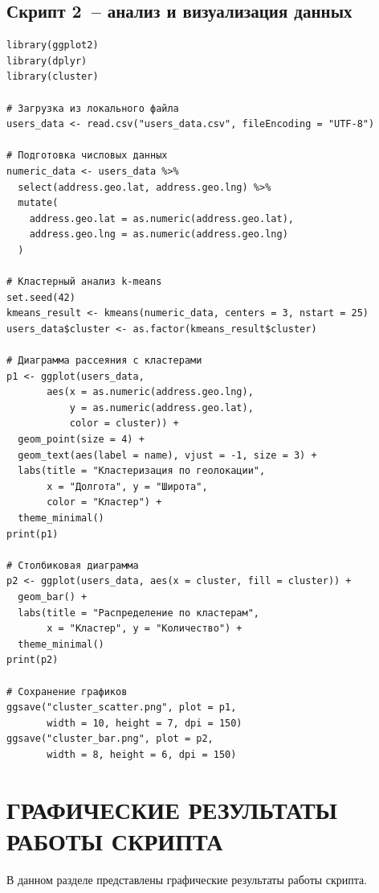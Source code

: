 \documentclass[14pt,a4paper]{extarticle}
\begin{document}
\newpage

\subsection{Скрипт 2~-- анализ и визуализация данных}

\begin{lstlisting}[caption={Скрипт lab2\_script2.R}, label=lst:script2]
library(ggplot2)
library(dplyr)
library(cluster)

# Загрузка из локального файла
users_data <- read.csv("users_data.csv", fileEncoding = "UTF-8")

# Подготовка числовых данных
numeric_data <- users_data %>%
  select(address.geo.lat, address.geo.lng) %>%
  mutate(
    address.geo.lat = as.numeric(address.geo.lat),
    address.geo.lng = as.numeric(address.geo.lng)
  )

# Кластерный анализ k-means
set.seed(42)
kmeans_result <- kmeans(numeric_data, centers = 3, nstart = 25)
users_data$cluster <- as.factor(kmeans_result$cluster)

# Диаграмма рассеяния с кластерами
p1 <- ggplot(users_data,
       aes(x = as.numeric(address.geo.lng),
           y = as.numeric(address.geo.lat),
           color = cluster)) +
  geom_point(size = 4) +
  geom_text(aes(label = name), vjust = -1, size = 3) +
  labs(title = "Кластеризация по геолокации",
       x = "Долгота", y = "Широта",
       color = "Кластер") +
  theme_minimal()
print(p1)

# Столбиковая диаграмма
p2 <- ggplot(users_data, aes(x = cluster, fill = cluster)) +
  geom_bar() +
  labs(title = "Распределение по кластерам",
       x = "Кластер", y = "Количество") +
  theme_minimal()
print(p2)

# Сохранение графиков
ggsave("cluster_scatter.png", plot = p1,
       width = 10, height = 7, dpi = 150)
ggsave("cluster_bar.png", plot = p2,
       width = 8, height = 6, dpi = 150)
\end{lstlisting}

\newpage

\section{ГРАФИЧЕСКИЕ РЕЗУЛЬТАТЫ РАБОТЫ СКРИПТА}

В данном разделе представлены графические результаты работы скрипта.
\end{document}
